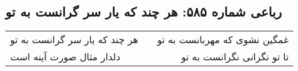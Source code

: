 \begin{center}
\section*{رباعی شماره ۵۸۵: هر چند که یار سر گرانست به تو}
\label{sec:sh585}
\begin{longtable}{l p{0.5cm} r}
هر چند که یار سر گرانست به تو
&&
غمگین نشوی که مهربانست به تو
\\
دلدار مثال صورت آینه است
&&
تا تو نگرانی نگرانست به تو
\\
\end{longtable}
\end{center}
